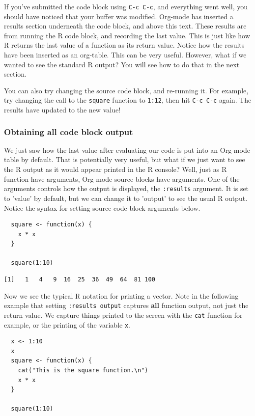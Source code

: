 \documentclass[11pt]{article}
\begin{document}
If you've submitted the code block using \texttt{C-c C-c}, and everything went well, you should have noticed that your buffer was modified. Org-mode has inserted a results section underneath the code block, and above this text. These results are from running the R code block, and recording the last value. This is just like how R returns the last value of a function as its return value. Notice how the results have been inserted as an org-table. This can be very useful. However, what if we wanted to see the standard R output? You will see how to do that in the next section.

You can also try changing the source code block, and re-running it. For example, try changing the call to the \texttt{square} function to \texttt{1:12}, then hit \texttt{C-c C-c} again. The results have updated to the new value!
\subsubsection*{Obtaining all code block output}
\label{sec-3-2-2}

We just saw how the last value after evaluating our code is put into an Org-mode table by default. That is potentially very useful, but what if we just want to see the R output as it would appear printed in the R console? Well, just as R function have arguments, Org-mode source blocks have arguments. One of the arguments controls how the output is displayed, the \texttt{:results} argument. It is set to 'value' by default, but we can change it to 'output' to see the usual R output. Notice the syntax for setting source code block arguments below.

\begin{verbatim}
  square <- function(x) {
    x * x
  }

  square(1:10)
\end{verbatim}

\begin{verbatim}
[1]   1   4   9  16  25  36  49  64  81 100
\end{verbatim}


Now we see the typical R notation for printing a vector. Note in the following example that setting \texttt{:results output} captures \textbf{all} function output, not just the return value. We capture things printed to the screen with the \texttt{cat} function for example, or the printing of the variable \texttt{x}.

\begin{verbatim}
  x <- 1:10
  x
  square <- function(x) {
    cat("This is the square function.\n")
    x * x
  }
  
  square(1:10)
\end{verbatim}
\end{document}
